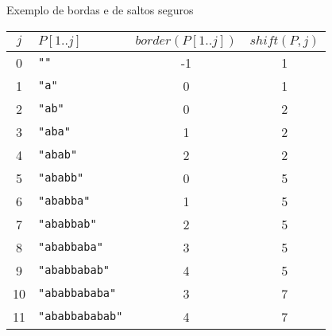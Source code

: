 \begin{frame}[fragile]{Exemplo de bordas e de saltos seguros}

    \begin{center}
    \begin{tabularx}{0.9\textwidth}{cXcc}
        \toprule
        $j$ & $P[1..j]$ & $border(P[1..j])$ & $shift(P, j)$ \\
        \midrule
        0&\textcolor{red!70}{\verb|""|}&-1&1 \\
        1&\textcolor{red!70}{\verb|"a"|}&0&1 \\
        2&\textcolor{red!70}{\verb|"ab"|}&0&2 \\
        3&\textcolor{red!70}{\verb|"aba"|}&1&2 \\
        4&\textcolor{red!70}{\verb|"abab"|}&2&2 \\
        5&\textcolor{red!70}{\verb|"ababb"|}&0&5 \\
        6&\textcolor{red!70}{\verb|"ababba"|}&1&5 \\
        7&\textcolor{red!70}{\verb|"ababbab"|}&2&5 \\
        8&\textcolor{red!70}{\verb|"ababbaba"|}&3&5 \\
        9&\textcolor{red!70}{\verb|"ababbabab"|}&4&5 \\
        10&\textcolor{red!70}{\verb|"ababbababa"|}&3&7 \\
        11&\textcolor{red!70}{\verb|"ababbababab"|}&4&7 \\
        \bottomrule
    \end{tabularx}
    \end{center}

\end{frame}

